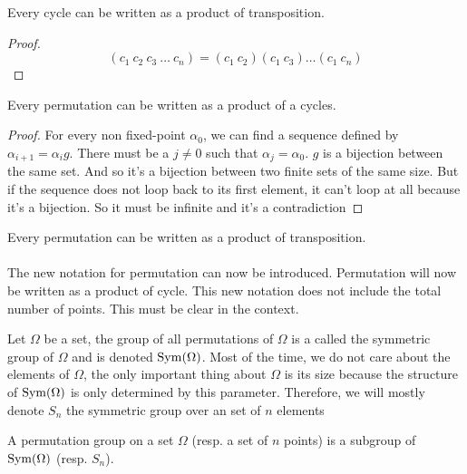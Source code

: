 \begin{proposition}
  Every cycle can be written as a product of transposition.
\end{proposition}

\begin{proof}
  \[
    (c_1\ c_2\ c_3\ \dots\ c_n) = (c_1\ c_2)(c_1\ c_3)\dots(c_1\ c_n)
  \]
\end{proof}

\begin{proposition}
  Every permutation can be written as a product of a cycles.
\end{proposition}

\begin{proof}
  For every non fixed-point $\alpha_0$, we can find a sequence defined by $\alpha_{i+1} = \alpha_i g$. There must be a $j \neq 0$ such that $\alpha_j = \alpha_0$. $g$ is a bijection between the same set. And so it's a bijection between two finite sets of the same size. But if the sequence does not loop back to its first element, it can't loop at all because it's a bijection. So it must be infinite and it's a contradiction
\end{proof}

\begin{corollary}
  Every permutation can be written as a product of transposition.
\end{corollary}

\paragraph{}
The new notation for permutation can now be introduced. Permutation will now be written as a product of cycle. This new notation does not include the total number of points. This must be clear in the context.

\begin{definition}
  Let $\Omega$ be a set, the group of all permutations of $\Omega$ is a called the symmetric group of $\Omega$ and is denoted $\operatorname{Sym}(\Omega)$. Most of the time, we do not care about the elements of $\Omega$, the only important thing about $\Omega$ is its size because the structure of $\operatorname{Sym}(\Omega)$ is only determined by this parameter. Therefore, we will mostly denote $S_n$ the symmetric group over an set of $n$ elements
\end{definition}

\begin{definition}
  A permutation group on a set $\Omega$ (resp. a set of $n$ points) is a subgroup of $\operatorname{Sym}(\Omega)$ (resp. $S_n$).
\end{definition}

